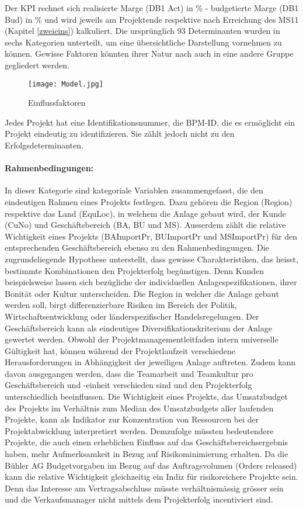 Der KPI rechnet sich realisierte Marge (DB1 Act) in \% - budgetierte Marge (DB1 Bud) in \% und wird jeweils am Projektende respektive nach Erreichung des MS11 (Kapitel \ref{zweieins}) kalkuliert. Die ursprünglich 93 Determinanten wurden in sechs Kategorien unterteilt, um eine übersichtliche Darstellung vornehmen zu können. Gewisse Faktoren könnten ihrer Natur nach auch in eine andere Gruppe gegliedert werden. 
\begin{figure}[H]
	\centering
	\texttt{[image: Model.jpg]}
	\caption{Einflussfaktoren
	\label{Einflussfaktoren}}
\end{figure}
Jedes Projekt hat eine Identifikationsnummer, die BPM-ID, die es ermöglicht ein Projekt eindeutig zu identifizieren. Sie zählt jedoch nicht zu den Erfolgsdeterminanten.
\paragraph{Rahmenbedingungen:} In dieser Kategorie sind kategoriale Variablen zusammengefasst, die den eindeutigen Rahmen eines Projekts festlegen. Dazu gehören die Region (Region) respektive das Land (EquLoc), in welchem die Anlage gebaut wird, der Kunde (CuNo) und Geschäftsbereich (BA, BU und MS). Ausserdem zählt die relative Wichtigkeit eines Projekts (BAImportPr, BUImportPr und MSImportPr) für den entsprechenden Geschäftsbereich ebenso zu den Rahmenbedingungen. Die zugrundeliegende Hypothese unterstellt, dass gewisse Charakteristiken, das heisst, bestimmte Kombinationen den Projekterfolg begünstigen. Denn Kunden beispielsweise lassen sich bezügliche der individuellen Anlagespezifikationen, ihrer Bonität oder Kultur unterscheiden. Die Region in welcher die Anlage gebaut werden soll, birgt differenzierbare Risiken im Bereich der Politik, Wirtschaftsentwicklung oder länderspezifischer Handelsregelungen. Der Geschäftsbereich kann als eindeutiges Diversifikationskriterium der Anlage gewertet werden. Obwohl der Projektmanagementleitfaden intern universelle Gültigkeit hat, können während der Projektlaufzeit verschiedene Herausforderungen in Abhängigkeit der jeweiligen Anlage auftreten. Zudem kann davon ausgegangen werden, dass die Teamarbeit und Teamkultur pro Geschäftsbereich und -einheit verschieden sind und den Projekterfolg unterschiedlich beeinflussen. Die Wichtigkeit eines Projekts, das Umsatzbudget des Projekts im Verhältnis zum Median des Umsatzbudgets aller laufenden Projekte, kann als Indikator zur Konzentration von Ressourcen bei der Projektabwicklung interpretiert werden. Demzufolge müssten bedeutendere Projekte, die auch einen erheblichen Einfluss auf das Geschäftsbereichsergebnis haben, mehr Aufmerksamkeit in Bezug auf Risikominimierung erhalten. Da die Bühler AG Budgetvorgaben im Bezug auf das Auftragsvolumen (Orders released) kann die relative Wichtigkeit gleichzeitig ein Indiz für risikoreichere Projekte sein. Denn das Interesse am Vertragsabschluss müsste verhältnismässig grösser sein und die Verkaufsmanager nicht mittels dem Projekterfolg incentiviert sind.
